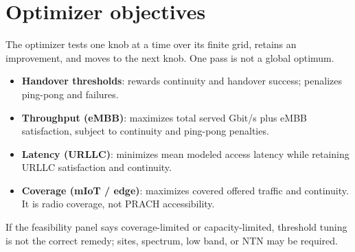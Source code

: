 \documentclass[10pt]{article}
\newcommand{\ui}[1]{\textsf{\textbf{#1}}}
\begin{document}
\section{Optimizer objectives}
The optimizer tests one knob at a time over its finite grid, retains an improvement, and moves to the next knob. One pass is not a global optimum.
\begin{itemize}
  \item \ui{Handover thresholds}: rewards continuity and handover success; penalizes ping-pong and failures.
  \item \ui{Throughput (eMBB)}: maximizes total served Gbit/s plus eMBB satisfaction, subject to continuity and ping-pong penalties.
  \item \ui{Latency (URLLC)}: minimizes mean modeled access latency while retaining URLLC satisfaction and continuity.
  \item \ui{Coverage (mIoT / edge)}: maximizes covered offered traffic and continuity. It is radio coverage, not PRACH accessibility.
\end{itemize}
If the feasibility panel says coverage-limited or capacity-limited, threshold tuning is not the correct remedy; sites, spectrum, low band, or NTN may be required.
\end{document}
